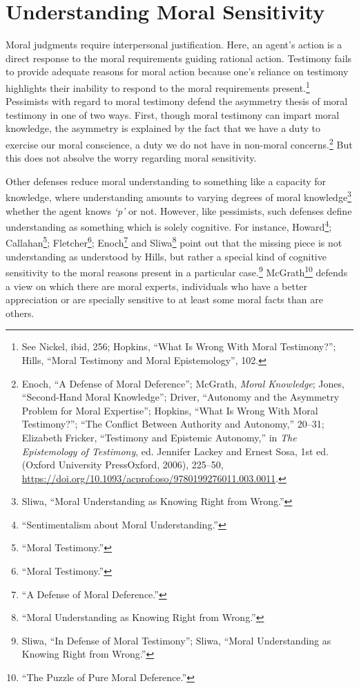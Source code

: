 \documentclass[phdthesis,12pt,final]{wuthesis}
\theoremstyle{definition}
\theoremstyle{definition}
\theoremstyle{definition}
\theoremstyle{definition}
\theoremstyle{remark}
\begin{document}
\section{Understanding Moral Sensitivity}\label{understanding-moral-sensitivity}

Moral judgments require interpersonal justification. Here, an agent's action is a direct response to the moral requirements guiding rational action. Testimony fails to provide adequate reasons for moral action because one's reliance on testimony highlights their inability to respond to the moral requirements present.\footnote{See Nickel, ibid, 256; Hopkins, {``What {Is Wrong With Moral Testimony}?''}; Hills, {``Moral Testimony and Moral Epistemology''}, 102.} Pessimists with regard to moral testimony defend the asymmetry thesis of moral testimony in one of two ways. First, though moral testimony can impart moral knowledge, the asymmetry is explained by the fact that we have a duty to exercise our moral conscience, a duty we do not have in non-moral concerns.\footnote{Enoch, {``A {Defense} of {Moral Deference}''}; McGrath, \emph{Moral {Knowledge}}; Jones, {``Second-{Hand Moral Knowledge}''}; Driver, {``Autonomy and the {Asymmetry Problem} for {Moral Expertise}''}; Hopkins, {``What {Is Wrong With Moral Testimony}?''}; {``The {Conflict Between Authority} and {Autonomy},''} 20--31; Elizabeth Fricker, {``Testimony and {Epistemic Autonomy},''} in \emph{The {Epistemology} of {Testimony}}, ed. Jennifer Lackey and Ernest Sosa, 1st ed. (Oxford University PressOxford, 2006), 225--50, \url{https://doi.org/10.1093/acprof:oso/9780199276011.003.0011}.} But this does not absolve the worry regarding moral sensitivity.

Other defenses reduce moral understanding to something like a capacity for knowledge, where understanding amounts to varying degrees of moral knowledge\footnote{Sliwa, {``Moral {Understanding} as {Knowing Right} from {Wrong}.''}} whether the agent knows \emph{`p'} or not. However, like pessimists, such defenses define understanding as something which is solely cognitive. For instance, Howard\footnote{{``Sentimentalism about {Moral Understanding}.''}}; Callahan\footnote{{``Moral {Testimony}.''}}; Fletcher\footnote{{``Moral {Testimony}.''}}; Enoch\footnote{{``A {Defense} of {Moral Deference}.''}} and Sliwa\footnote{{``Moral {Understanding} as {Knowing Right} from {Wrong}.''}} point out that the missing piece is not understanding as understood by Hills, but rather a special kind of cognitive sensitivity to the moral reasons present in a particular case.\footnote{Sliwa, {``In Defense of Moral Testimony''}; Sliwa, {``Moral {Understanding} as {Knowing Right} from {Wrong}.''}} McGrath\footnote{{``The {Puzzle} of {Pure Moral Deference}.''}} defends a view on which there are moral experts, individuals who have a better appreciation or are specially sensitive to at least some moral facts than are others.
\end{document}
